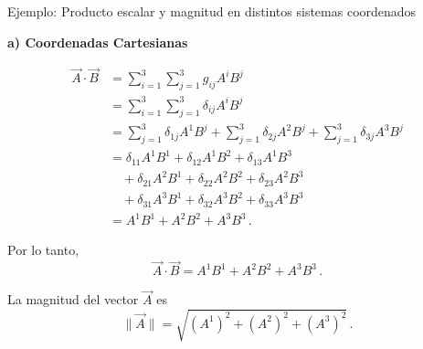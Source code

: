 \documentclass[../apunte_mecanica_clasica.tex]{subfiles}%
\begin{document}
\begin{apuntebloque}{Ejemplo: Producto escalar y magnitud en distintos sistemas coordenados}

\textbf{a) Coordenadas Cartesianas}

\begin{align*}
    \vec{A} \cdot \vec{B} 
        &= \sum_{i=1}^3 \sum_{j=1}^3 g_{ij} A^i B^j \\[4pt] 
        &= \sum_{i=1}^3 \sum_{j=1}^3 \delta_{ij} A^i B^j \\[4pt]
        &= \sum_{j=1}^3 \delta_{1j} A^1 B^j 
         + \sum_{j=1}^3 \delta_{2j} A^2 B^j 
         + \sum_{j=1}^3 \delta_{3j} A^3 B^j \\[4pt]
        &= \delta_{11}A^1B^1 + \delta_{12}A^1B^2 + \delta_{13}A^1B^3 \\
        &\quad + \delta_{21}A^2B^1 + \delta_{22}A^2B^2 + \delta_{23}A^2B^3 \\
        &\quad + \delta_{31}A^3B^1 + \delta_{32}A^3B^2 + \delta_{33}A^3B^3 \\[4pt]
        &= A^1B^1 + A^2B^2 + A^3B^3 \,.
\end{align*}

Por lo tanto,
\begin{equation*}
    \vec{A} \cdot \vec{B} = A^1B^1 + A^2B^2 + A^3B^3 \,.
\end{equation*}

La magnitud del vector $\vec{A}$ es
\begin{equation*}
    \|\vec{A}\| = \sqrt{(A^1)^2 + (A^2)^2 + (A^3)^2} \,.
\end{equation*}

\bigskip

\end{apuntebloque}
\end{document}
